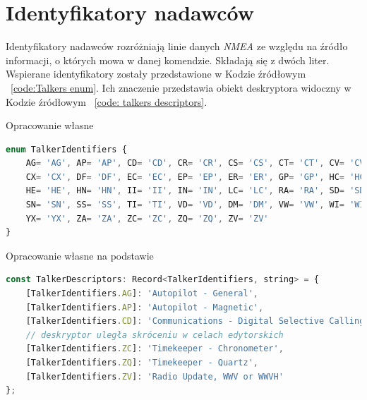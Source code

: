 \documentclass[skorowidz,skroty]{dyplomWEZUT}
\begin{document}
\section{Identyfikatory nadawców}\label{sec:talker ids}
Identyfikatory nadawców rozróżniają linie danych \textit{NMEA} ze względu na źródło informacji, o których mowa w danej komendzie. Składają się z dwóch liter. Wspierane identyfikatory zostały przedstawione w Kodzie źródłowym ~\ref{code:Talkers enum}. Ich znaczenie przedstawia obiekt deskryptora widoczny w Kodzie źródłowym ~\ref{code: talkers descriptors}. 

{Opracowanie własne \cite{gpsinformation, Raymond2019}}{\label{code:Talkers enum}}
\begin{lstlisting}[language=JavaScript]
enum TalkerIdentifiers {
    AG= 'AG', AP= 'AP', CD= 'CD', CR= 'CR', CS= 'CS', CT= 'CT', CV= 'CV',
    CX= 'CX', DF= 'DF', EC= 'EC', EP= 'EP', ER= 'ER', GP= 'GP', HC= 'HC',
    HE= 'HE', HN= 'HN', II= 'II', IN= 'IN', LC= 'LC', RA= 'RA', SD= 'SD',
    SN= 'SN', SS= 'SS', TI= 'TI', VD= 'VD', DM= 'DM', VW= 'VW', WI= 'WI',
    YX= 'YX', ZA= 'ZA', ZC= 'ZC', ZQ= 'ZQ', ZV= 'ZV'
}
\end{lstlisting}

{Opracowanie własne na podstawie \cite{gpsinformation, Raymond2019}}{\label{code: talkers descriptors}}
\begin{lstlisting}[language=JavaScript]
const TalkerDescriptors: Record<TalkerIdentifiers, string> = {
    [TalkerIdentifiers.AG]: 'Autopilot - General',
    [TalkerIdentifiers.AP]: 'Autopilot - Magnetic',
    [TalkerIdentifiers.CD]: 'Communications - Digital Selective Calling (DSC)',
    // deskryptor uległa skróceniu w celach edytorskich
    [TalkerIdentifiers.ZC]: 'Timekeeper - Chronometer',
    [TalkerIdentifiers.ZQ]: 'Timekeeper - Quartz',
    [TalkerIdentifiers.ZV]: 'Radio Update, WWV or WWVH'
};
\end{lstlisting}
\end{document}
